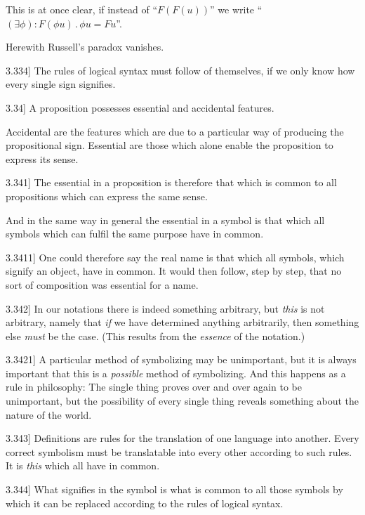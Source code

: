 \documentclass[12pt,oneside]{book}[2007/10/19]
\newcommand{\PropositionE}[2]{%
  \item[\phantomsection\label{PropE:#1}\PropGRef{#1}] #2%
}
\newcommand{\PropGRef}[1]{\hyperref[PropG:#1]{#1}}
\newcommand{\DotOp}{\mathbin{.}}
\begin{document}
\begin{propositions}
{This is at once clear, if instead of ``$F(F(u))$'' we
write ``$(\exists\phi) : F(\phi u) \DotOp \phi u = Fu$''.

Herewith Russell's paradox vanishes.}


\PropositionE{3.334}
{The rules of logical syntax must follow of themselves,
if we only know how every single sign
signifies.}


\PropositionE{3.34}
{A proposition possesses essential and accidental
features.

Accidental are the features which are due to a
particular way of producing the propositional sign.
Essential are those which alone enable the proposition
to express its sense.}


\PropositionE{3.341}
{The essential in a proposition is therefore that
which is common to all propositions which can
express the same sense.

And in the same way in general the essential in
a symbol is that which all symbols which can
fulfil the same purpose have in common.}


\PropositionE{3.3411}
{One could therefore say the real name is that
which all symbols, which signify an object, have
in common. It would then follow, step by step,
that no sort of composition was essential for a name.}


\PropositionE{3.342}
{In our notations there is indeed something
arbitrary, but \emph{this} is not arbitrary, namely that
\emph{if} we have determined anything arbitrarily, then
something else \emph{must} be the case. (This results
from the \emph{essence} of the notation.)}


\PropositionE{3.3421}
{A particular method of symbolizing may be
unimportant, but it is always important that this
is a \emph{possible} method of symbolizing. And this
happens as a rule in philosophy: The single
thing proves over and over again to be unimportant,
but the possibility of every single thing reveals
something about the nature of the world.}


\PropositionE{3.343}
{Definitions are rules for the translation of one
language into another. Every correct symbolism
must be translatable into every other according
to such rules. It is \emph{this} which all have in
common.}
\enlargethispage{-9pt} %


\PropositionE{3.344}
{What signifies in the symbol is what is
common to all those symbols by which it can
be replaced according to the rules of logical
syntax.}



\end{propositions}
\end{document}
